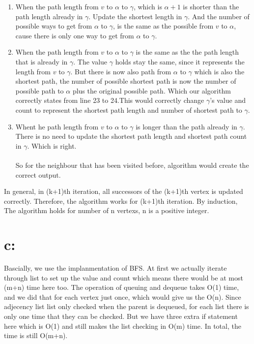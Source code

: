 \documentclass[]{article}
\begin{document}
\begin{enumerate}
    \item When the path length from $v$ to $\alpha$ to $\gamma$, which is $\alpha +1 $ 
    is shorter than the path length already in $\gamma$.
    Update the shortest length in $\gamma$. And the number of possible ways to 
    get from $\alpha$ to $\gamma$, is the same as the possible from $v$ to 
    $\alpha$, cause there is only one way to get from $\alpha$ to $\gamma$.
    
    \item When the path length from $v$ to $\alpha$ to $\gamma$ is the same as the 
    the path length that is already in $\gamma$. The value $\gamma$ holds stay the 
    same, since it represents the length from $v$ to $\gamma$. But there is now 
    also path from $\alpha$ to $\gamma$ which is also the shortest path, the number 
    of possible shortest path is now the number of possible path to $\alpha$ plus
    the original possible path. Which our algorithm correctly states from line 
    23 to 24.This would correctly change $\gamma$'s value and count to represent the
    shortest path length and number of shortest path to $\gamma$.
    
    \item Whent he path length from $v$ to $\alpha$ to $\gamma$ is longer than the 
    path already in $\gamma$. There is no need to update the shortest path length
    and shortest path count in $\gamma$. Which is right.\\
    \\So for the neighbour that has been visited before, algorithm would create 
    the correct output.
\end{enumerate}

In general, in (k+1)th iteration, all successors of the (k+1)th vertex is updated
correctly. Therefore, the algorithm works for (k+1)th iteration. By induction,
The algorithm holds for number of n vertexs, n is a positive integer.

\section{c:}
Bascially, we use the implanmentation of BFS.
At first we actually iterate through list to set up the value and count which 
means there would be at most (m+n) time here too.
The operation of queuing and dequeue takes O(1) time, and we did that for
each vertex just once, which would give us the O(n). Since adjecency list
list only checked when the parent is dequeued, for each list there is only
one time that they can be checked. But we have three extra if statement here
which is O(1) and still makes the list checking in O(m) time. 
 In total, the time is still O(m+n). 
    
\end{document}
